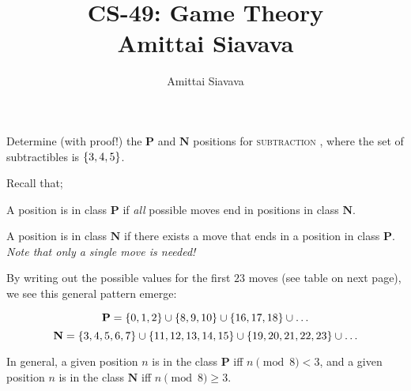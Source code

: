 \documentclass[11pt, reqno]{amsart}
\begin{document}

\title{CS-49: Game Theory\\ Amittai Siavava \\ }
\author{Amittai Siavava}


\setlength{\headheight}{13.0pt}
\setlength{\footskip}{15.0pt}

\maketitle

\bigskip

\def \cram { \textsc{cram} }
\def \dom { \textsc{domineering} }
\def \sub { \textsc{subtraction} }

\begin{problem}[6]
  Determine (with proof!) the $\mathbf{P}$ and $\mathbf{N}$ positions for \sub,
  where the set of subtractibles is $\left\{3,4,5\right\}$.

  \step
  Recall that;
  \begin{enumarabic}
    \item A position is in class $\mathbf{P}$ if \emph{all} possible moves end in positions
      in class $\mathbf{N}$.
    \item A position is in class $\mathbf{N}$ if there exists a move that ends in a
      position in class $\mathbf{P}$.\\
      \emph{Note that only a single move is needed!}
  \end{enumarabic}

  By writing out the possible values for the first $23$ moves (see table on next page),
  we see this general pattern emerge:

  \[\mathbf{P} = \left\{ 0, 1, 2\right\} \cup \left\{8, 9, 10\right\} \cup \left\{16, 17, 18\right\} \cup \ldots \]
  \[\mathbf{N} = \left\{3, 4, 5, 6, 7\right\} \cup \left\{11, 12, 13, 14, 15\right\} \cup \left\{19, 20, 21, 22, 23\right\} \cup \ldots \]

  \step
  In general, a given position $n$ is in the class $\mathbf{P}$ iff $n \pmod{8} < 3$,
  and a given position $n$ is in the class $\mathbf{N}$ iff $n \pmod{8} \ge 3$.


\end{problem}
\end{document}
